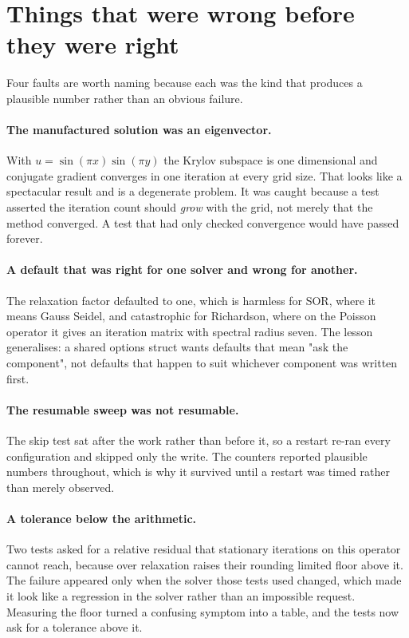 \section{Things that were wrong before they were right}

Four faults are worth naming because each was the kind that produces a plausible
number rather than an obvious failure.

\paragraph{The manufactured solution was an eigenvector.} With
$u = \sin(\pi x)\sin(\pi y)$ the Krylov subspace is one dimensional and
conjugate gradient converges in one iteration at every grid size. That looks
like a spectacular result and is a degenerate problem. It was caught because a
test asserted the iteration count should \emph{grow} with the grid, not merely
that the method converged. A test that had only checked convergence would have
passed forever.

\paragraph{A default that was right for one solver and wrong for another.} The
relaxation factor defaulted to one, which is harmless for SOR, where it means
Gauss Seidel, and catastrophic for Richardson, where on the Poisson operator it
gives an iteration matrix with spectral radius seven. The lesson generalises: a
shared options struct wants defaults that mean "ask the component", not defaults
that happen to suit whichever component was written first.

\paragraph{The resumable sweep was not resumable.} The skip test sat after the
work rather than before it, so a restart re-ran every configuration and skipped
only the write. The counters reported plausible numbers throughout, which is why
it survived until a restart was timed rather than merely observed.

\paragraph{A tolerance below the arithmetic.} Two tests asked for a relative
residual that stationary iterations on this operator cannot reach, because over
relaxation raises their rounding limited floor above it. The failure appeared
only when the solver those tests used changed, which made it look like a
regression in the solver rather than an impossible request. Measuring the floor
turned a confusing symptom into a table, and the tests now ask for a tolerance
above it.

